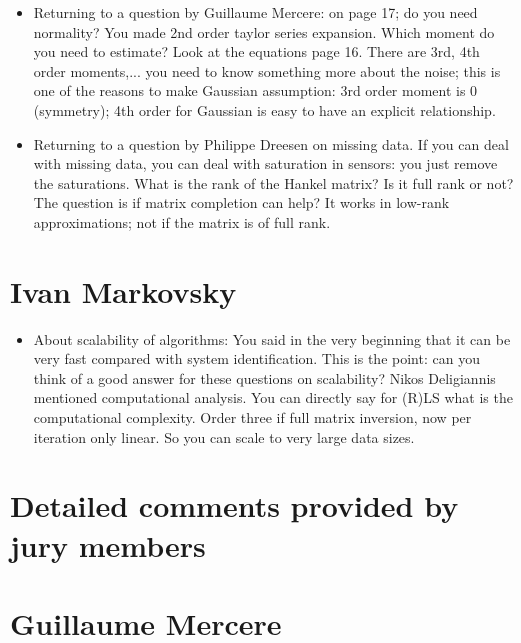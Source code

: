 \documentclass[11pt]{article}
\begin{document}
\begin{itemize}
	\item Returning to a question by Guillaume Mercere: on page 17; do you need normality? You made 2nd order taylor series expansion. Which moment do you need to estimate? Look at the equations page 16. There are 3rd, 4th order moments,... you need to know something more about the noise; this is one of the reasons to make Gaussian assumption: 3rd order moment is 0 (symmetry); 4th order for Gaussian is easy to have an explicit relationship.
	
	\item  Returning to a question by Philippe Dreesen on missing data. If you can deal with missing data, you can deal with saturation in sensors: you just remove the saturations. What is the rank of the Hankel matrix? Is it full rank or not? The question is if matrix completion can help? It works in low-rank approximations; not if the matrix is of full rank.

\end{itemize}

\section*{Ivan Markovsky}

\begin{itemize}
	\item About scalability of algorithms: You said in the very beginning that it can be very fast compared with system identification. This is the point: can you think of a good answer for these questions on scalability? Nikos Deligiannis mentioned computational analysis. You can directly say for (R)LS what is the computational complexity. Order three if full matrix inversion, now per iteration only linear. So you can scale to very large data sizes.
	

\end{itemize}

\section*{Detailed comments provided by jury members}

\section*{Guillaume Mercere}
\end{document}
